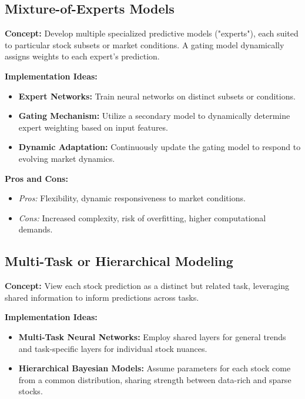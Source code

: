 \documentclass[twocolumn]{article}
\begin{document}
\subsection{Mixture-of-Experts Models}

\textbf{Concept:} 
Develop multiple specialized predictive models ("experts"), each suited to particular stock subsets or market conditions. A gating model dynamically assigns weights to each expert’s prediction.

\textbf{Implementation Ideas:}

\begin{itemize}
    \item \textbf{Expert Networks:} Train neural networks on distinct subsets or conditions.
    \item \textbf{Gating Mechanism:} Utilize a secondary model to dynamically determine expert weighting based on input features.
    \item \textbf{Dynamic Adaptation:} Continuously update the gating model to respond to evolving market dynamics.
\end{itemize}

\textbf{Pros and Cons:}
\begin{itemize}
    \item \textit{Pros:} Flexibility, dynamic responsiveness to market conditions.
    \item \textit{Cons:} Increased complexity, risk of overfitting, higher computational demands.
\end{itemize}

\subsection{Multi-Task or Hierarchical Modeling}

\textbf{Concept:} 
View each stock prediction as a distinct but related task, leveraging shared information to inform predictions across tasks.

\textbf{Implementation Ideas:}

\begin{itemize}
    \item \textbf{Multi-Task Neural Networks:} Employ shared layers for general trends and task-specific layers for individual stock nuances.
    \item \textbf{Hierarchical Bayesian Models:} Assume parameters for each stock come from a common distribution, sharing strength between data-rich and sparse stocks.
\end{itemize}
\end{document}
